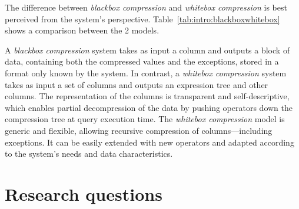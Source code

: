 The difference between \textit{blackbox compression} and \textit{whitebox compression} is best perceived from the system's perspective. Table~\ref{tab:intro:blackboxwhitebox} shows a comparison between the 2 models.



A \textit{blackbox compression} system takes as input a column and outputs a block of data, containing both the compressed values and the exceptions, stored in a format only known by the system. In contrast, a \textit{whitebox compression} system takes as input a set of columns and outputs an expression tree and other columns. The representation of the columns is transparent and self-descriptive, which enables  partial decompression of the data by pushing operators down the compression tree at query execution time. The \textit{whitebox compression} model is generic and flexible, allowing recursive compression of columns---including exceptions. It can be easily extended with new operators and adapted according to the system's needs and data characteristics.

\iffalse
- distinction between whitebox and blackbox compression/representation
- see presentation slides
\fi


\section{Research questions}

